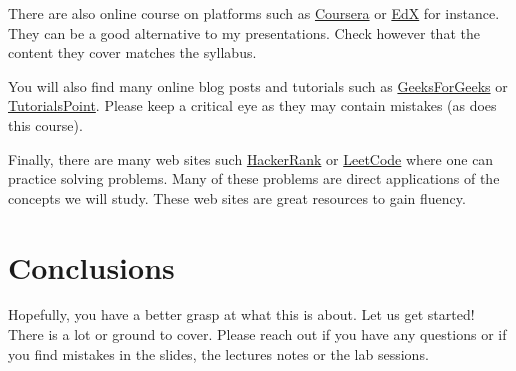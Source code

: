\documentclass{aldast}
\begin{document}
There are also online course on platforms such as
\href{https://www.coursera.org}{Coursera} or
\href{https://www.edx.org}{EdX} for instance. They can be a good
alternative to my presentations. Check however that the content they
cover matches the syllabus.

You will also find many online blog posts and tutorials such as
\href{www.geeksforgeeks.com}{GeeksForGeeks} or
\href{www.tutorialspoint.com}{TutorialsPoint}. Please keep a critical
eye as they may contain mistakes (as does this course).

Finally, there are many web sites such
\href{http://www.hackerrank.com}{HackerRank} or
\href{https://leetcode.com}{LeetCode} where one can practice solving
problems. Many of these problems are direct applications of the
concepts we will study. These web sites are great resources to gain
fluency.


\section*{Conclusions}
Hopefully, you have a better grasp at what this is about. Let us get
started! There is a lot or ground to cover. Please reach out if you
have any questions or if you find mistakes in the slides, the lectures
notes or the lab sessions.



\end{document}

